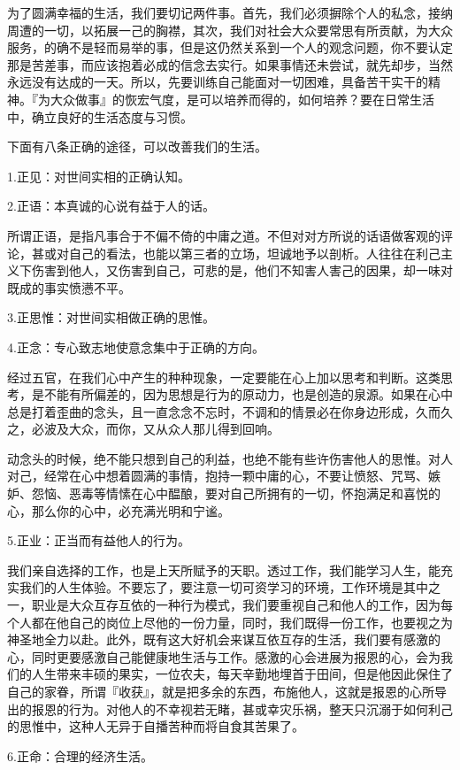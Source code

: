\documentclass[12pt,twoside,openany]{book}
\begin{document}
为了圆满幸福的生活，我们要切记两件事。首先，我们必须摒除个人的私念，接纳周遭的一切，以拓展一己的胸襟，其次，我们对社会大众要常思有所贡献，为大众服务，的确不是轻而易举的事，但是这仍然关系到一个人的观念问题，你不要认定那是苦差事，而应该抱着必成的信念去实行。如果事情还未尝试，就先却步，当然永远没有达成的一天。所以，先要训练自己能面对一切困难，具备苦干实干的精神。『为大众做事』的恢宏气度，是可以培养而得的，如何培养？要在日常生活中，确立良好的生活态度与习惯。

下面有八条正确的途径，可以改善我们的生活。

1.正见：对世间实相的正确认知。

2.正语：本真诚的心说有益于人的话。

所谓正语，是指凡事合于不偏不倚的中庸之道。不但对对方所说的话语做客观的评论，甚或对自己的看法，也能以第三者的立场，坦诚地予以剖析。人往往在利己主义下伤害到他人，又伤害到自己，可悲的是，他们不知害人害己的因果，却一味对既成的事实愤懑不平。

3.正思惟：对世间实相做正确的思惟。

4.正念：专心致志地使意念集中于正确的方向。

经过五官，在我们心中产生的种种现象，一定要能在心上加以思考和判断。这类思考，是不能有所偏差的，因为思想是行为的原动力，也是创造的泉源。如果在心中总是打着歪曲的念头，且一直念念不忘时，不调和的情景必在你身边形成，久而久之，必波及大众，而你，又从众人那儿得到回响。

动念头的时候，绝不能只想到自己的利益，也绝不能有些许伤害他人的思惟。对人对己，经常在心中想着圆满的事情，抱持一颗中庸的心，不要让愤怒、咒骂、嫉妒、怨恼、恶毒等情愫在心中醖酿，要对自己所拥有的一切，怀抱满足和喜悦的心，那么你的心中，必充满光明和宁谧。

5.正业：正当而有益他人的行为。

我们亲自选择的工作，也是上天所赋予的天职。透过工作，我们能学习人生，能充实我们的人生体验。不要忘了，要注意一切可资学习的环境，工作环境是其中之一，职业是大众互存互依的一种行为模式，我们要重视自己和他人的工作，因为每个人都在他自己的岗位上尽他的一份力量，同时，我们既得一份工作，也要视之为神圣地全力以赴。此外，既有这大好机会来谋互依互存的生活，我们要有感激的心，同时更要感激自己能健康地生活与工作。感激的心会进展为报恩的心，会为我们的人生带来丰硕的果实，一位农夫，每天辛勤地埋首于田间，但是他因此保住了自己的家眷，所谓『收获』，就是把多余的东西，布施他人，这就是报恩的心所导出的报恩的行为。对他人的不幸视若无睹，甚或幸灾乐祸，整天只沉溺于如何利己的思惟中，这种人无异于自播苦种而将自食其苦果了。

6.正命：合理的经济生活。
\end{document}

